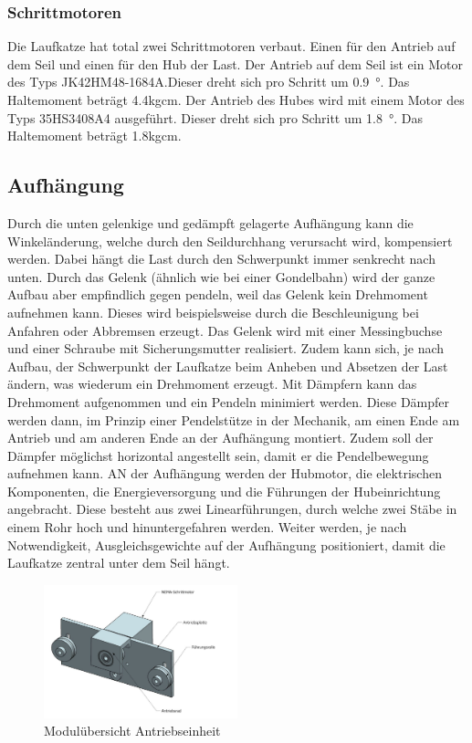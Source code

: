 \documentclass[a4paper]{report}
\begin{document}
\subsubsection{Schrittmotoren}
Die Laufkatze hat total zwei Schrittmotoren verbaut. Einen für den Antrieb auf dem Seil und einen für den Hub der Last. Der Antrieb auf dem Seil ist ein Motor des Typs JK42HM48-1684A.Dieser dreht sich pro Schritt um \SI{0.9}{\degree}. Das Haltemoment beträgt 4.4kgcm. Der Antrieb des Hubes wird mit einem Motor des Typs 35HS3408A4 ausgeführt. Dieser dreht sich pro Schritt um \SI{1.8}{\degree}. Das Haltemoment beträgt 1.8kgcm.



\subsection{Aufhängung}
Durch die unten gelenkige und gedämpft gelagerte Aufhängung kann die Winkeländerung, welche durch den Seildurchhang verursacht wird, kompensiert werden. Dabei hängt die Last durch den Schwerpunkt immer senkrecht nach unten. Durch das Gelenk (ähnlich wie bei einer Gondelbahn) wird der ganze Aufbau aber empfindlich gegen pendeln, weil das Gelenk kein Drehmoment aufnehmen kann. Dieses wird beispielsweise durch die Beschleunigung bei Anfahren oder Abbremsen erzeugt. Das Gelenk wird mit einer Messingbuchse und einer Schraube mit Sicherungsmutter realisiert. Zudem kann sich, je nach Aufbau, der Schwerpunkt der Laufkatze beim Anheben und Absetzen der Last ändern, was wiederum ein Drehmoment erzeugt. Mit Dämpfern kann das Drehmoment aufgenommen und ein Pendeln minimiert werden. Diese Dämpfer werden dann, im Prinzip einer Pendelstütze in der Mechanik, am einen Ende am Antrieb und am anderen Ende an der Aufhängung montiert. Zudem soll der Dämpfer möglichst horizontal angestellt sein, damit er die Pendelbewegung aufnehmen kann. AN der Aufhängung werden der Hubmotor, die elektrischen Komponenten, die Energieversorgung und die Führungen der Hubeinrichtung angebracht. Diese besteht aus zwei Linearführungen, durch welche zwei Stäbe in einem Rohr hoch und hinuntergefahren werden. Weiter werden, je nach Notwendigkeit, Ausgleichsgewichte auf der Aufhängung positioniert, damit die Laufkatze zentral unter dem Seil hängt.


\begin{figure}[h!]
	\centering
	\includegraphics[keepaspectratio,width=0.5\textwidth]{Antriebseinheit}
	\caption{Modulübersicht Antriebseinheit	}
	\label{fig:SystemArchitektur}
\end{figure}
\end{document}
